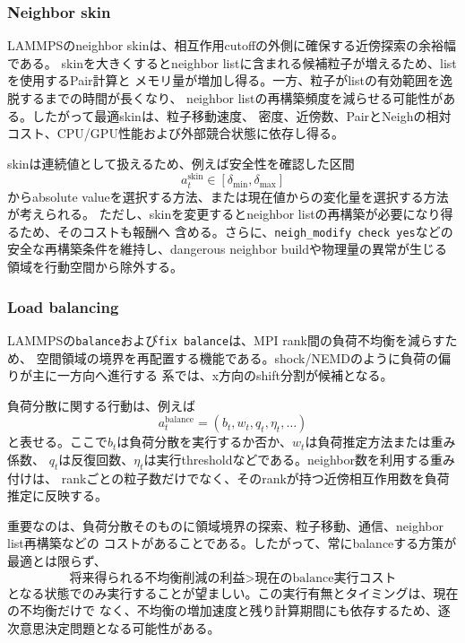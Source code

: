 \subsubsection{Neighbor skin}

LAMMPSのneighbor skinは、相互作用cutoffの外側に確保する近傍探索の余裕幅である。
skinを大きくするとneighbor listに含まれる候補粒子が増えるため、listを使用するPair計算と
メモリ量が増加し得る。一方、粒子がlistの有効範囲を逸脱するまでの時間が長くなり、
neighbor listの再構築頻度を減らせる可能性がある。したがって最適skinは、粒子移動速度、
密度、近傍数、PairとNeighの相対コスト、CPU/GPU性能および外部競合状態に依存し得る。

skinは連続値として扱えるため、例えば安全性を確認した区間
\begin{equation}
  a_t^{\mathrm{skin}}\in[\delta_{\min},\delta_{\max}]
\end{equation}
からabsolute valueを選択する方法、または現在値からの変化量を選択する方法が考えられる。
ただし、skinを変更するとneighbor listの再構築が必要になり得るため、そのコストも報酬へ
含める。さらに、\texttt{neigh\_modify check yes}などの安全な再構築条件を維持し、dangerous
neighbor buildや物理量の異常が生じる領域を行動空間から除外する。

\subsubsection{Load balancing}

LAMMPSの\texttt{balance}および\texttt{fix balance}は、MPI rank間の負荷不均衡を減らすため、
空間領域の境界を再配置する機能である。shock/NEMDのように負荷の偏りが主に一方向へ進行する
系では、x方向のshift分割が候補となる。

負荷分散に関する行動は、例えば
\begin{equation}
 a_t^{\mathrm{balance}}
 = (b_t,w_t,q_t,\eta_t,\ldots)
\end{equation}
と表せる。ここで$b_t$は負荷分散を実行するか否か、$w_t$は負荷推定方法または重み係数、
$q_t$は反復回数、$\eta_t$は実行thresholdなどである。neighbor数を利用する重み付けは、
rankごとの粒子数だけでなく、そのrankが持つ近傍相互作用数を負荷推定に反映する。

重要なのは、負荷分散そのものに領域境界の探索、粒子移動、通信、neighbor list再構築などの
コストがあることである。したがって、常にbalanceする方策が最適とは限らず、
\begin{equation}
 \text{将来得られる不均衡削減の利益}
 > \text{現在のbalance実行コスト}
\end{equation}
となる状態でのみ実行することが望ましい。この実行有無とタイミングは、現在の不均衡だけで
なく、不均衡の増加速度と残り計算期間にも依存するため、逐次意思決定問題となる可能性がある。

